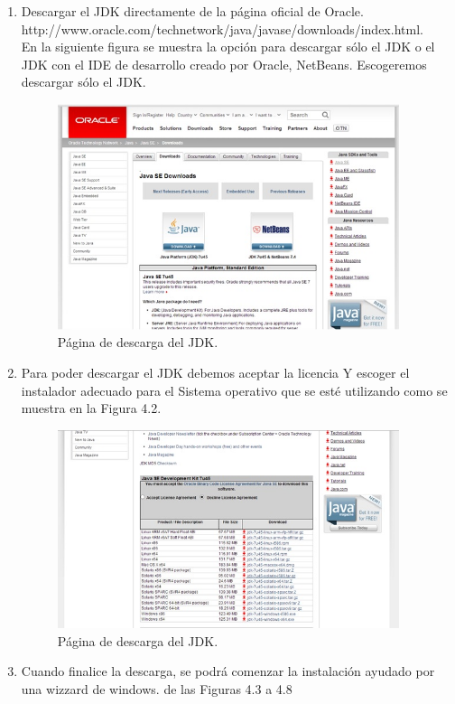 \documentclass[12pt]{book} %
\begin{document}
\begin{enumerate}
\item Descargar el JDK directamente de la página oficial de Oracle. \\http://www.oracle.com/technetwork/java/javase/downloads/index.html.\\
En la siguiente figura se muestra la opción para descargar sólo el JDK o el JDK con el IDE de desarrollo creado por Oracle, NetBeans. Escogeremos descargar sólo el JDK.
	
	\begin{figure}[h!]
		\centering
			\includegraphics[width=10cm]{ins1.jpg}
			\caption{P\'agina de descarga del JDK.}
		
	\end{figure}
	
\item Para poder descargar el JDK debemos aceptar la licencia Y escoger el instalador adecuado para el Sistema operativo que se esté utilizando como se muestra en la Figura 4.2.

	\begin{figure}[h]
		\centering
			\includegraphics[width=10cm]{ins2.jpg}
			\caption{P\'agina de descarga del JDK.}
		
	\end{figure}

\item Cuando finalice la descarga, se podr\'a comenzar la instalaci\'on ayudado por una wizzard de windows. de las Figuras 4.3 a 4.8


\end{enumerate}
\end{document}
